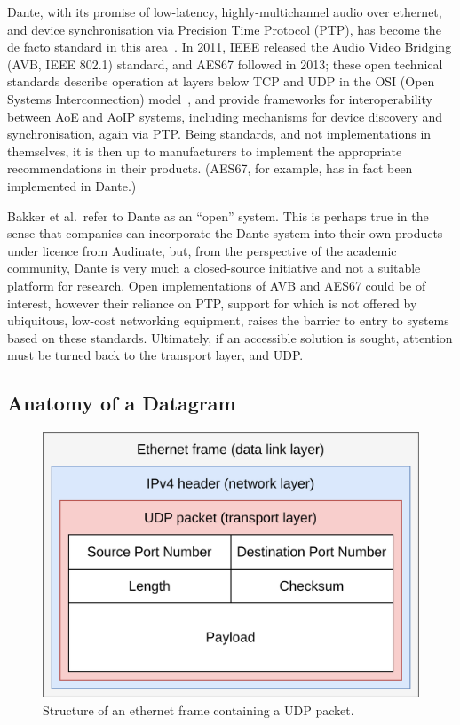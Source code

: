 Dante, with its promise of low-latency, highly-multichannel audio over ethernet,
and device synchronisation via Precision Time Protocol (PTP), has become the de
facto standard in this area~\citep{bakker_introduction_2014}.
In 2011, IEEE released the Audio Video Bridging (AVB, IEEE 802.1) standard,
and AES67 followed in 2013; these open technical standards describe operation
at layers below TCP and UDP in the OSI (Open Systems Interconnection)
model~\citep{}, and provide frameworks for
interoperability between AoE and AoIP systems, including mechanisms for device
discovery and synchronisation, again via PTP\@.
Being standards, and not implementations in themselves, it is then up to
manufacturers to implement the appropriate recommendations in their products.
(AES67, for example, has in fact been implemented in Dante.)

Bakker et al.\ refer to Dante as an ``open'' system.
This is perhaps true in the sense that companies can incorporate the Dante
system into their own products under licence from Audinate, but, from the
perspective of the academic community, Dante is very much a closed-source
initiative and not a suitable platform for research.
Open implementations of AVB and AES67 could be of interest, however their
reliance on PTP, support for which is not offered by ubiquitous, low-cost
networking equipment, raises the barrier to entry to systems based on these
standards.
Ultimately, if an accessible solution is sought, attention must be turned back
to the transport layer, and UDP\@.

\subsection{Anatomy of a Datagram}\label{subsec:anatomy-of-a-datagram}

\begin{figure}[h]
    \centering
    \includegraphics[width=.5\textwidth]{figures/udp}
    \caption{Structure of an ethernet frame containing a UDP packet.}
    \label{fig:udp-frame}
\end{figure}

